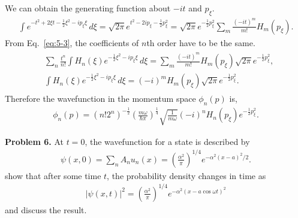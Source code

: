 \documentclass[floatfix,nofootinbib,superscriptaddress,fleqn]{revtex4-2}
\begin{document}
We can obtain the generating function about $-it$ and $p_\xi$.
\begin{align}
  \int e^{-t^2 +2\xi t-\frac{1}{2}\xi^2 -i p_\xi\xi } \,d\xi
  =\sqrt{2\pi}e^{t^2-2ip_\xi-\frac{1}{2}p^2_\xi}
  =\sqrt{2\pi}e^{-\frac{1}{2}p^2_\xi}
  \sum_m\frac{\left(-it\right)^m}{m!}H_m(p_\xi).
\end{align}
From Eq.~\eqref{eq:5-3}, the coefficients of $n$th order 
have to be the same.
\begin{align}
  \begin{split}
    &\sum_n \frac{t^n}{n!}\int H_n(\xi)
    e^{-\frac{1}{2}\xi^2 -i p_\xi\xi }\, d\xi
    =\sum_m\frac{\left(-it\right)^m}{m!}H_m(p_\xi)
    \sqrt{2\pi}e^{-\frac{1}{2}p^2_\xi},  \\
    &\int H_n(\xi)
    e^{-\frac{1}{2}\xi^2 -i p_\xi\xi }\, d\xi
    =(-i)^mH_m(p_\xi)
    \sqrt{2\pi}e^{-\frac{1}{2}p^2_\xi}.
  \end{split}
\end{align}
Therefore the wavefunction in the momentum space $\phi_n(p)$ is,
\begin{align}
  \phi_n(p) = (n!2^n)^{-\frac{1}{2}}
  \left(\frac{m\omega}{\hbar\pi}\right)^{\frac{1}{4}}
  \sqrt{\frac{1}{m\omega }}(-i)^nH_n(p_\xi)
  e^{-\frac{1}{2}p^2_\xi}.
\end{align}
\vspace{1cm}

\noindent \textbf{Problem 6.}
At $t=0$, the wavefunction for a state is described by
\begin{align}\label{eq:6-1}
\psi(x,0) = \sum_n A_n u_n(x) =
  \left(\frac{\alpha^2}{\pi}\right)^{1/4} e^{-\alpha^2(x-a)^2/2}  .
\end{align}
show that after some time $t$, the probability density changes in time
as 
\begin{align}\label{eq:6-2}
|\psi(x,t)|^2  =  \left(\frac{\alpha^2}{\pi}\right)^{1/4}e^{-\alpha^2
  (x-a\cos\omega t)^2}
\end{align}
and discuss the result. 
\end{document}
